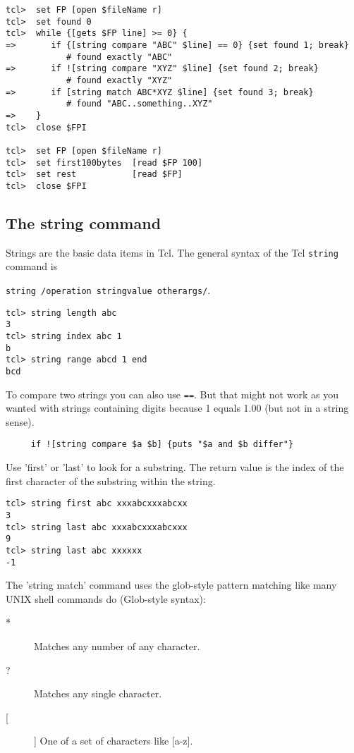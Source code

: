 \begin{verbatim}
tcl>  set FP [open $fileName r]
tcl>  set found 0
tcl>  while {[gets $FP line] >= 0} {
=>       if {[string compare "ABC" $line] == 0} {set found 1; break}
            # found exactly "ABC"
=>       if ![string compare "XYZ" $line] {set found 2; break}
            # found exactly "XYZ"
=>       if [string match ABC*XYZ $line] {set found 3; break}
            # found "ABC..something..XYZ"
=>    }
tcl>  close $FPI

tcl>  set FP [open $fileName r]
tcl>  set first100bytes  [read $FP 100] 
tcl>  set rest           [read $FP]
tcl>  close $FPI
\end{verbatim}

\subsection*{The string command}

Strings are the basic data items in Tcl. The general syntax of the Tcl
\texttt{string} command is

\texttt{string /operation stringvalue otherargs/}.

\begin{verbatim}
tcl> string length abc
3
tcl> string index abc 1
b
tcl> string range abcd 1 end
bcd
\end{verbatim}

To compare two strings  you can also  use \texttt{==}. But  that might
not work as you wanted with strings containing digits because 1 equals
1.00 (but not in a string sense).

\begin{verbatim}
     if ![string compare $a $b] {puts "$a and $b differ"} 
\end{verbatim}

Use 'first' or 'last' to look for a substring. The return value is the
index of the first character of the substring within the string.

\begin{verbatim}
tcl> string first abc xxxabcxxxabcxx
3
tcl> string last abc xxxabcxxxabcxxx
9
tcl> string last abc xxxxxx
-1
\end{verbatim}

The 'string match' command uses the glob-style pattern matching like
many UNIX shell commands do (Glob-style syntax):

\begin{description}
\item[*] Matches any number of any character.
\item[?] Matches any single character.
\item[[ ]] One of a set of characters like [a-z].
\end{description}

